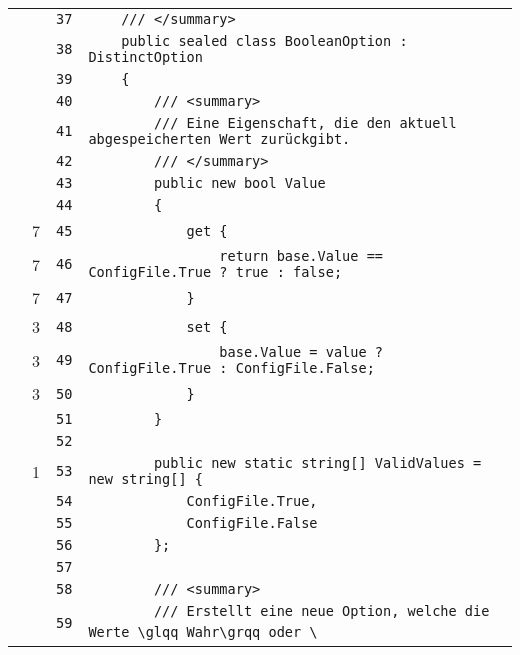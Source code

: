 \documentclass[a4paper,10pt]{article}
\begin{document}
\begin{longtable}[l]{lrrl}
\cellcolor{gray} &  & \verb~37~ & \verb~    /// </summary>~\\
\cellcolor{gray} &  & \verb~38~ & \verb~    public sealed class BooleanOption : DistinctOption~\\
\cellcolor{gray} &  & \verb~39~ & \verb~    {~\\
\cellcolor{gray} &  & \verb~40~ & \verb~        /// <summary>~\\
\cellcolor{gray} &  & \verb~41~ & \verb~        /// Eine Eigenschaft, die den aktuell abgespeicherten Wert zurückgibt.~\\
\cellcolor{gray} &  & \verb~42~ & \verb~        /// </summary>~\\
\cellcolor{gray} &  & \verb~43~ & \verb~        public new bool Value~\\
\cellcolor{gray} &  & \verb~44~ & \verb~        {~\\
\cellcolor{green} & 7 & \verb~45~ & \verb~            get {~\\
\cellcolor{green} & 7 & \verb~46~ & \verb~                return base.Value == ConfigFile.True ? true : false;~\\
\cellcolor{green} & 7 & \verb~47~ & \verb~            }~\\
\cellcolor{green} & 3 & \verb~48~ & \verb~            set {~\\
\cellcolor{green} & 3 & \verb~49~ & \verb~                base.Value = value ? ConfigFile.True : ConfigFile.False;~\\
\cellcolor{green} & 3 & \verb~50~ & \verb~            }~\\
\cellcolor{gray} &  & \verb~51~ & \verb~        }~\\
\cellcolor{gray} &  & \verb~52~ & \verb~~\\
\cellcolor{green} & 1 & \verb~53~ & \verb~        public new static string[] ValidValues = new string[] {~\\
\cellcolor{gray} &  & \verb~54~ & \verb~            ConfigFile.True,~\\
\cellcolor{gray} &  & \verb~55~ & \verb~            ConfigFile.False~\\
\cellcolor{gray} &  & \verb~56~ & \verb~        };~\\
\cellcolor{gray} &  & \verb~57~ & \verb~~\\
\cellcolor{gray} &  & \verb~58~ & \verb~        /// <summary>~\\
\cellcolor{gray} &  & \verb~59~ & \verb~        /// Erstellt eine neue Option, welche die Werte \glqq Wahr\grqq oder \~\\

\end{longtable}
\end{document}
